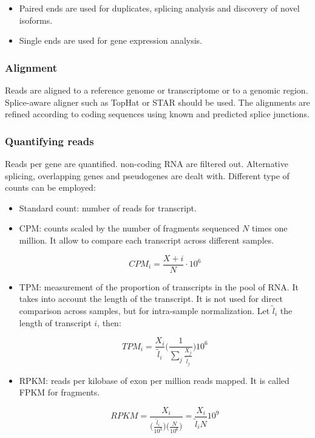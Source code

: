 		\begin{multicols}{2}
			\begin{itemize}
				\item Paired ends are used for duplicates, splicing analysis and discovery of novel isoforms.
				\item Single ends are used for gene expression analysis.
			\end{itemize}
		\end{multicols}

		\subsubsection{Alignment}
		Reads are aligned to a reference genome or transcriptome or to a genomic region.
		Splice-aware aligner such as TopHat or STAR should be used.
		The alignments are refined according to coding sequences using known and predicted splice junctions.

		\subsubsection{Quantifying reads}
		Reads per gene are quantified.
		non-coding RNA are filtered out.
		Alternative splicing, overlapping genes and pseudogenes are dealt with.
		Different type of counts can be employed:

		\begin{multicols}{2}
			\begin{itemize}
				\item Standard count: number of reads for transcript.
				\item CPM: counts scaled by the number of fragments sequenced $N$ times one million.
					It allow to compare each transcript across different samples.

					$$CPM_i = \frac{X+i}{N}\cdot 10^6$$

				\item TPM: measurement of the proportion of transcripts in the pool of RNA.
					It takes into account the length of the transcript.
					It is not used for direct comparison across samples, but for intra-sample normalization.
					Let $\tilde{l}_i$ the length of transcript $i$, then:

					$$TPM_i = \frac{X_i}{\tilde{l}_i}\biggl(\frac{1}{\sum\limits_j\frac{X_j}{\tilde{l}_j}}\biggr)10^6$$

				\item RPKM: reads per kilobase of exon per million reads mapped.
					It is called FPKM for fragments.

					$$RPKM = \frac{X_i}{\big(\frac{\tilde{l}_i}{10^3}\big)\big(\frac{N}{10^6}\big)} = \frac{X_i}{\tilde{l}_iN}10^9$$
			\end{itemize}
		\end{multicols}

